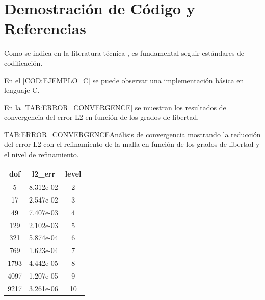\section{Demostración de Código y Referencias}

Como se indica en la literatura técnica \cite{primes}, es fundamental seguir estándares de codificación.

En el \cref{COD:EJEMPLO_C} se puede observar una implementación básica en lenguaje C.


En la \cref{TAB:ERROR_CONVERGENCE} se muestran los resultados de convergencia del error L2 en función de los grados de libertad.

\begin{table}[Convergencia del Error]{TAB:ERROR_CONVERGENCE}{Análisis de convergencia mostrando la reducción del error L2 con el refinamiento de la malla en función de los grados de libertad y el nivel de refinamiento.}
    \begin{tabular}{ccc}
        \hline
        \textbf{dof} & \textbf{l2\_err} & \textbf{level} \\
        \hline \hline
        5            & 8.312e-02        & 2              \\
        17           & 2.547e-02        & 3              \\
        49           & 7.407e-03        & 4              \\
        129          & 2.102e-03        & 5              \\
        321          & 5.874e-04        & 6              \\
        769          & 1.623e-04        & 7              \\
        1793         & 4.442e-05        & 8              \\
        4097         & 1.207e-05        & 9              \\
        9217         & 3.261e-06        & 10             \\
        \hline
    \end{tabular}
\end{table}